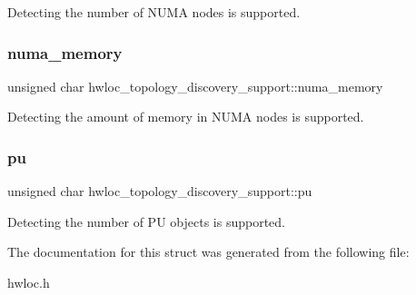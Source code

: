 Detecting the number of N\+U\+MA nodes is supported. 

\mbox{\label{a00290_af193eb858e40e12ef4923f5ed0e1f11a}} 
\subsubsection{\texorpdfstring{numa\+\_\+memory}{numa\_memory}}
{\footnotesize\ttfamily unsigned char hwloc\+\_\+topology\+\_\+discovery\+\_\+support\+::numa\+\_\+memory}



Detecting the amount of memory in N\+U\+MA nodes is supported. 

\mbox{\label{a00290_ad7bb4ecf7a82f5a04fc632e9592ad3ab}} 
\subsubsection{\texorpdfstring{pu}{pu}}
{\footnotesize\ttfamily unsigned char hwloc\+\_\+topology\+\_\+discovery\+\_\+support\+::pu}



Detecting the number of PU objects is supported. 



The documentation for this struct was generated from the following file\+:\begin{DoxyCompactItemize}
\item 
hwloc.\+h\end{DoxyCompactItemize}
